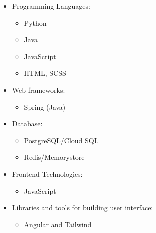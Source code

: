 \begin{itemize}
    \item Programming Languages:
        \begin{itemize}
            \item Python
            \item Java
            \item JavaScript
            \item HTML, SCSS
        \end{itemize}
    \item Web frameworks:
        \begin{itemize}
            \item Spring (Java)
        \end{itemize}
    \item Database:
        \begin{itemize}
            \item PostgreSQL/Cloud SQL
            \item Redis/Memorystore
        \end{itemize}
    \item Frontend Technologies:
        \begin{itemize}
            \item JavaScript
        \end{itemize}
    \item Libraries and tools for building user interface: 
        \begin{itemize}
            \item Angular and Tailwind
    \end{itemize}
\end{itemize}



